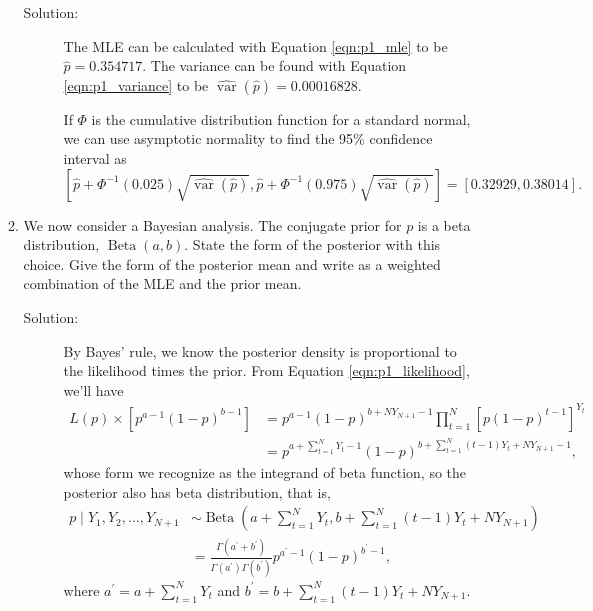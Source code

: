 \documentclass[letterpaper,11pt]{article}
\begin{document}
\begin{enumerate}
\begin{enumerate}
    \begin{description}
    \item[Solution:] The MLE can be calculated with Equation \ref{eqn:p1_mle} to
      be $\boxed{\hat{p} = 0.354717.}$ The variance can be found with Equation
      \ref{eqn:p1_variance} to be
      $\boxed{\hat{\operatorname{var}}\left(\hat{p}\right) = 0.00016828.}$

      If $\Phi$ is the cumulative distribution function for a standard normal,
      we can use asymptotic normality to find the 95\% confidence interval as
      \begin{equation*}
        \left[
          \hat{p} +
          \Phi^{-1}\left(0.025\right)\sqrt{\hat{\operatorname{var}}\left(\hat{p}\right)},
          \hat{p} +
          \Phi^{-1}\left(0.975\right)\sqrt{\hat{\operatorname{var}}\left(\hat{p}\right)}
        \right]
        =
        \boxed{\left[0.32929,0.38014\right].}
      \end{equation*}
    \end{description}
  \item We now consider a Bayesian analysis. The conjugate prior for $p$ is a
    beta distribution, $\operatorname{Beta}\left(a, b\right)$. State the form of
    the posterior with this choice. Give the form of the posterior mean and
    write as a weighted combination of the MLE and the prior mean.

    \begin{description}
    \item[Solution:] By Bayes' rule, we know the posterior density is
      proportional to the likelihood times the prior. From Equation
      \ref{eqn:p1_likelihood}, we'll have
      \begin{align*}
        L\left(p\right) \times \left[
        p^{a-1}\left(1-p\right)^{b-1}
        \right]
        &= p^{a-1}\left(1 - p\right)^{b + NY_{N+1} - 1}
          \prod_{t=1}^N\left[
          p\left(1 - p\right)^{t-1}
          \right]^{Y_t} \\
        &= p^{a + \sum_{t=1}^N Y_t -1}
          \left(1 - p\right)^{b + \sum_{t=1}^N (t-1)Y_t + NY_{N+1} - 1},
      \end{align*}
      whose form we recognize as the integrand of beta function, so the
      posterior also has beta distribution, that is,
      \begin{align}
        p \mid Y_1,Y_2,\ldots,Y_{N+1}
        &\sim \operatorname{Beta}\left(
          a + \sum_{t=1}^N Y_t,
          b + \sum_{t=1}^N (t-1)Y_t + NY_{N+1}
          \right) \nonumber\\
        &= \frac{\Gamma\left(a^\prime + b^\prime\right)}
          {\Gamma\left(a^\prime\right)\Gamma\left(b^\prime\right)}
          p^{a^\prime -1}\left(1 - p\right)^{b^\prime - 1},
      \end{align}
      where $a^\prime = a + \sum_{t=1}^N Y_t$ and
      $b^\prime = b + \sum_{t=1}^N (t-1)Y_t + NY_{N+1}$.


\end{description}
\end{enumerate}
\end{enumerate}
\end{document}
